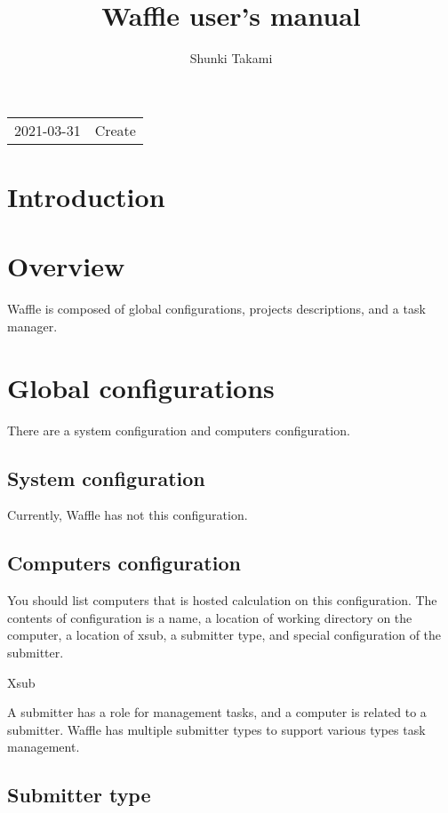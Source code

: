 \documentclass[a4paper]{article}
\title{Waffle user's manual}
\author{Shunki Takami}
\begin{document}
\maketitle
\thispagestyle{empty}
\begin{table}[]
\begin{tabular}{ll}
2021-03-31 & Create \\
\end{tabular}
\end{table}

\newpage \thispagestyle{empty}
\tableofcontents
\newpage \setcounter{page}{1}

\section{Introduction}

\section{Overview}
Waffle is composed of global configurations, projects descriptions, and a task manager.


\section{Global configurations}
There are a system configuration and computers configuration.
\subsection{System configuration}
Currently, Waffle has not this configuration.

\subsection{Computers configuration}
You should list computers that is hosted calculation on this configuration.
The contents of configuration is a name,
a location of working directory on the computer,
a location of xsub,
a submitter type, and special configuration of the submitter.

Xsub

A submitter has a role for management tasks, 
and a computer is related to a submitter.
Waffle has multiple submitter types to support various types task management.

\subsection{Submitter type}
\end{document}
